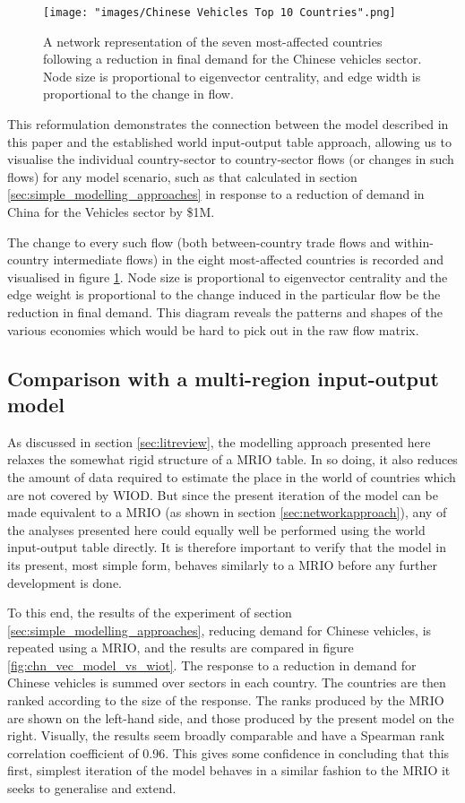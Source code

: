 \documentclass[a4paper]{article}
\begin{document}
\begin{figure}[tb]
\centering
\texttt{[image: "images/Chinese Vehicles Top 10 Countries".png]}
\caption{A network representation of the seven most-affected countries following a reduction in final demand for the Chinese vehicles sector. Node size is proportional to eigenvector centrality, and edge width is proportional to the change in flow.}\label{fig:chnvehtop6}
\end{figure}

This reformulation demonstrates the connection between the model described in this paper and the established world input-output table approach, allowing us to visualise the individual country-sector to country-sector flows (or changes in such flows) for any model scenario, such as that calculated in section \ref{sec:simple_modelling_approaches} in response to a reduction of demand in China for the Vehicles sector by \$1M.

The change to every such flow (both between-country trade flows and within-country intermediate flows) in the eight most-affected countries is recorded and visualised in figure \ref{fig:chnvehtop6}.
Node size is proportional to eigenvector centrality and the edge weight is proportional to the change induced in the particular flow be the reduction in final demand.
This diagram reveals the patterns and shapes of the various economies which would be hard to pick out in the raw flow matrix.

\subsection{Comparison with a multi-region input-output model}
As discussed in section \ref{sec:litreview}, the modelling approach presented here relaxes the somewhat rigid structure of a MRIO table.
In so doing, it also reduces the amount of data required to estimate the place in the world of countries which are not covered by WIOD.
But since the present iteration of the model can be made equivalent to a MRIO (as shown in section \ref{sec:networkapproach}), any of the analyses presented here could equally well be performed using the world input-output table directly.
It is therefore important to verify that the model in its present, most simple form, behaves similarly to a MRIO before any further development is done.

To this end, the results of the experiment of section \ref{sec:simple_modelling_approaches}, reducing demand for Chinese vehicles, is repeated using a MRIO, and the results are compared in figure \ref{fig:chn_vec_model_vs_wiot}.
The response to a reduction in demand for Chinese vehicles is summed over sectors in each country.
The countries are then ranked according to the size of the response.
The ranks produced by the MRIO are shown on the left-hand side, and those produced by the present model on the right.
Visually, the results seem broadly comparable and have a Spearman rank correlation coefficient \parencite{spearman_proof_1904} of 0.96.
This gives some confidence in concluding that this first, simplest iteration of the model behaves in a similar fashion to the MRIO it seeks to generalise and extend.
\end{document}
